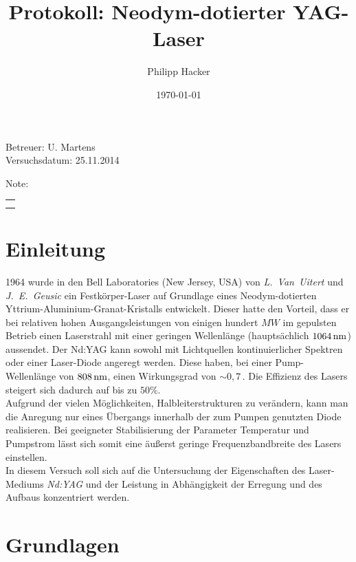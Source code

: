 \documentclass[numbers=noenddot,12pt,a4paper]{scrartcl}
\title{Protokoll: Neodym-dotierter YAG-Laser} %
\author{Philipp Hacker} %
\date{\today}
\newcommand{\tilt}[1]{\mbox{\textit{#1}}}
\begin{document}
\maketitle
\begin{center}
Betreuer: U. Martens\\ %
Versuchsdatum: 25.11.2014\\ %
\begin{table}[h]
\centering
Note: %
\begin{tabularx}{1.5cm}{|X|}
\hline \\ \\
\hline
\end{tabularx}
\end{table}
\end{center}
\vspace*{\fill}
\tableofcontents
\vfill
\newpage
\section{Einleitung}
1964 wurde in den Bell Laboratories (New Jersey, USA) von \tilt{L. Van Uitert} und \tilt{J. E. Geusic} ein Festkörper-Laser auf Grundlage eines Neodym-dotierten Yttrium-Aluminium-Granat-Kristalls entwickelt. Dieser hatte den Vorteil, dass er bei relativen hohen Ausgangsleistungen von einigen hundert $\unit{MW}$ im gepulsten Betrieb einen Laserstrahl mit einer geringen Wellenlänge (hauptsächlich $\unit[1064]{nm}$) aussendet. Der Nd:YAG kann sowohl mit Lichtquellen kontinuierlicher Spektren oder einer Laser-Diode angeregt werden. Diese haben, bei einer Pump-Wellenlänge von $\unit[808]{nm}$, einen Wirkungsgrad von $\sim0,7\,$. Die Effizienz des Lasers steigert sich dadurch auf bis zu $50\%$.\\ Aufgrund der vielen Möglichkeiten, Halbleiterstrukturen zu verändern, kann man die Anregung nur eines Übergangs innerhalb der zum Pumpen genutzten Diode realisieren. Bei geeigneter Stabilisierung der Parameter Temperatur und Pumpstrom lässt sich somit eine äußerst geringe Frequenzbandbreite des Lasers einstellen. \\
In diesem Versuch soll sich auf die Untersuchung der Eigenschaften des Laser-Mediums \tilt{Nd:YAG} und der Leistung in Abhängigkeit der Erregung und des Aufbaus konzentriert werden. 
\newpage
\section{Grundlagen}
\end{document}

